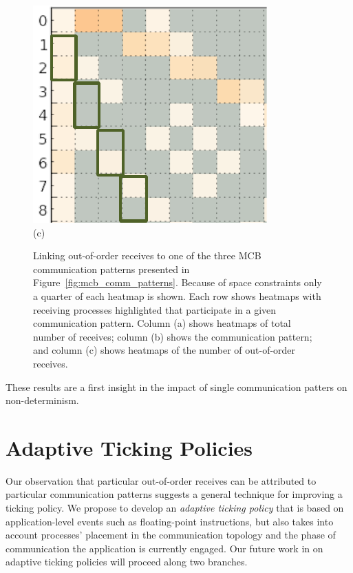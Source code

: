 \begin{figure}
\begin{minipage}[b]{0.33\linewidth}
        \includegraphics[width=0.9\linewidth]{chapter_4_figures/partial_heatmap_out_of_order_scatter}
        \\ (c) \\
    \end{minipage}
    \caption{Linking out-of-order receives to one of the three MCB
      communication patterns presented in
      Figure~\ref{fig:mcb_comm_patterns}. Because of space constraints
      only a quarter of each heatmap is shown.
      Each row shows heatmaps with receiving processes highlighted that participate in a given communication pattern.
      Column (a) shows heatmaps of total number of receives;
      column (b) shows the communication pattern;
      and column (c) shows heatmaps of the number of out-of-order receives.}
    \label{fig:comm_patterns_fault}
\end{figure}
These results are a first insight in the impact of single
communication patters on non-determinism.

\section{Adaptive Ticking Policies}

Our observation that particular out-of-order receives can be
attributed to particular communication patterns suggests a general
technique for improving a ticking policy. We propose to develop an
\textit{adaptive ticking policy} that is based on application-level
events such as floating-point instructions, but also takes into
account processes' placement in the communication topology and the
phase of communication the application is currently engaged. Our
future work in on adaptive ticking policies will proceed along two
branches.

